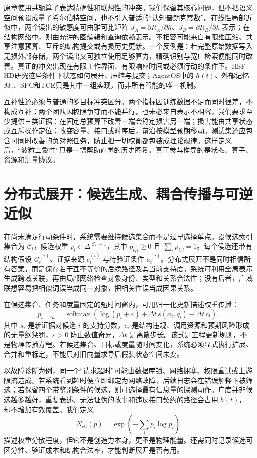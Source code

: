原章使用共轭算子表达精确性和联想性的冲突。我们保留其核心问题，但不把语义空间预设成量子希尔伯特空间，也不引入普适的“认知普朗克常数”。在线性局部近似中，两个读出的敏感度可由雅可比矩阵 $J_A=\partial R_A/\partial h$、$J_B=\partial R_B/\partial h$ 表示；在结构网络中，则由允许的图编辑和查询依赖表示。不相容可能来自有限维压缩、共享注意预算、互斥的结构提交或有损历史更新。一个反例是：若完整原始数据写入无损外部存储，两个读出又可独立使用足够算力，精确识别与宽广检索便能同时改善。真正的冲突出现在有限工作界面、有限响应时间或必须行动的条件下。HSF-HD研究这些条件下状态如何展开、压缩与提交；AgentOS中的 $h(t)$、外部记忆 $M_e$、SPC和TCE只是其中一组实现，而非所有智能的唯一机制。

互补性还必须与普通的多目标冲突区分。两个指标因训练数据不足而同时很差，不构成互补；两个团队因权限争夺而不能并行，也未必来自表示不相容。我们要求至少提供三类证据：在固定总预算下改善一端会稳定损害另一端；损害能由共享状态或互斥操作定位；改变容量、接口或时序后，前沿按模型预期移动。测试集还应包含可同时改善的负对照任务，防止把一切权衡都包装成理论规律。这样定义后，“波粒二象性”只是一幅帮助直觉的历史图景，真正参与推导的是状态、算子、资源和测量协议。

\section{分布式展开：候选生成、耦合传播与可逆近似}
\label{sec:section_9520}

在尚未满足行动条件时，系统需要维持候选集合而不是过早选择单点。设候选索引集合为 $\mathcal C_t$，候选权重 $p_t\in\Delta^{|\mathcal C_t|-1}$，其中 $p_{t,i}\ge0$ 且 $\sum_i p_{t,i}=1$。每个候选还带有结构假设 $G_t^{(i)}$、证据来源 $e_t^{(i)}$ 与待验证条件 $u_t^{(i)}$。分布式展开不是同时相信所有答案，而是保存若干互不等价的后续路径及其当前支持度。系统可利用全局表示生成跨域关联，再由局部网络检查对象身份、类型和关系合法性；没有后者，广域联想容易把相似词误当成同一对象，把相关性误当成因果关系。

在候选集合、任务和度量固定的短时间窗内，可用归一化更新描述权重传播：
\[
p_{t+\Delta t}=\operatorname{softmax}\!\left(\log(p_t+\varepsilon)+\Delta t\,s(x_t,q_t)-\Delta t\,c_t\right).
\]
其中 $s_i$ 是新证据对候选 $i$ 的支持分数，$c_i$ 是结构违规、调用资源和预期风险形成的无量纲惩罚，$\varepsilon>0$ 防止数值奇异，$\Delta t$ 是离散步长。该式是工程更新规则，不是物理传播方程。若候选集合、目标或度量随时间变化，系统必须显式执行扩展、合并和重标定，不能只对旧向量求导后假装状态空间未变。

以故障诊断为例，同一个“请求超时”可能由数据库锁、网络拥塞、权限重试或上游限流造成。若系统看到超时便立即绑定为网络故障，后续日志会在错误解释下被筛选；若保留四个带鉴别条件的候选，则可选择最有信息量的探测动作。广度并非候选越多越好，重复表述、无法证伪的故事和违反接口契约的路径会占用 $h(t)$，却不增加有效覆盖。我们定义
\[
N_{\mathrm{eff}}(p)=\exp\!\left(-\sum_i p_i\log p_i\right)
\]
描述权重分散程度，但它不是创造力本身，更不是物理能量。还需同时记录候选可区分性、验证成本和结构合法率，才能判断展开是否有用。

